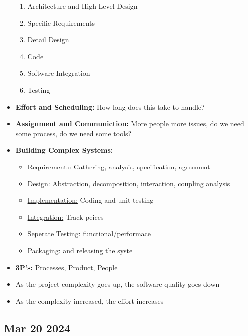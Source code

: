 \documentclass[12pt]{article}
\begin{document}
\begin{itemize}
\begin{enumerate}
					\item Architecture and High Level Design
					\item Specific Requirements
					\item Detail Design
					\item Code
					\item Software Integration
					\item Testing
		  		\end{enumerate}
			\item \textbf{Effort and Scheduling:} How long does this take to handle?
			\item \textbf{Assignment and Communiction:} More people more issues, 
					do we need some process, do we need some tools?
		  \item \textbf{Building Complex Systems:}
		  		\begin{itemize}
					\item \underline{Requirements:} Gathering, analysis, specification, agreement
					\item \underline{Design:} Abstraction, decomposition, interaction, coupling analysis
					\item \underline{Implementation:} Coding and unit testing
					\item \underline{Integration:} Track peices
					\item \underline{Seperate Testing:} functional/performace
					\item \underline{Packaging:} and releasing the syste
				\end{itemize}
			\item \textbf{3P's:} Processes, Product, People
			\item As the project complexity goes up, the software quality goes down
			\item As the complexity increased, the effort increases
\end{itemize}

\subsection*{Mar 20 2024}
\end{document}
